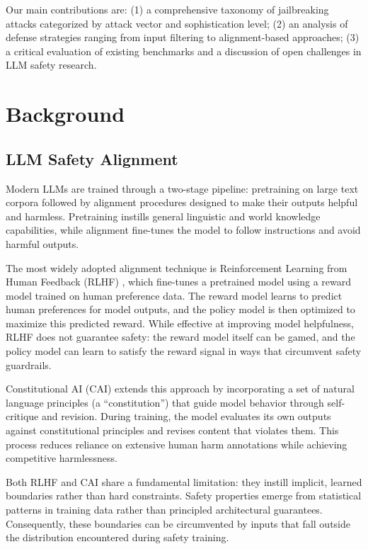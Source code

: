 \documentclass[conference]{IEEEtran}
\begin{document}
Our main contributions are: (1) a comprehensive taxonomy of jailbreaking attacks categorized by attack vector and sophistication level; (2) an analysis of defense strategies ranging from input filtering to alignment-based approaches; (3) a critical evaluation of existing benchmarks and a discussion of open challenges in LLM safety research.


\section{Background}

\subsection{LLM Safety Alignment}

Modern LLMs are trained through a two-stage pipeline: pretraining on large text corpora followed by alignment procedures designed to make their outputs helpful and harmless. Pretraining instills general linguistic and world knowledge capabilities, while alignment fine-tunes the model to follow instructions and avoid harmful outputs.

The most widely adopted alignment technique is Reinforcement Learning from Human Feedback (RLHF) \cite{bai2022constitutional}, which fine-tunes a pretrained model using a reward model trained on human preference data. The reward model learns to predict human preferences for model outputs, and the policy model is then optimized to maximize this predicted reward. While effective at improving model helpfulness, RLHF does not guarantee safety: the reward model itself can be gamed, and the policy model can learn to satisfy the reward signal in ways that circumvent safety guardrails.

Constitutional AI (CAI) \cite{bai2022constitutional} extends this approach by incorporating a set of natural language principles (a ``constitution'') that guide model behavior through self-critique and revision. During training, the model evaluates its own outputs against constitutional principles and revises content that violates them. This process reduces reliance on extensive human harm annotations while achieving competitive harmlessness.

Both RLHF and CAI share a fundamental limitation: they instill implicit, learned boundaries rather than hard constraints. Safety properties emerge from statistical patterns in training data rather than principled architectural guarantees. Consequently, these boundaries can be circumvented by inputs that fall outside the distribution encountered during safety training.
\end{document}
